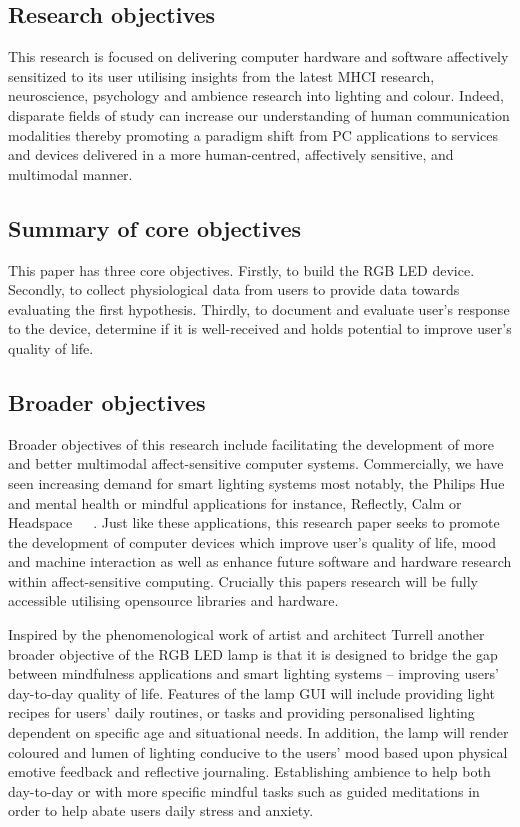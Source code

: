 \documentclass{sigchi}
\begin{document}
\subsection{Research objectives}

This research is focused on delivering computer hardware and software affectively sensitized to its user utilising insights from the latest MHCI research, neuroscience, psychology and ambience research into lighting and colour. Indeed, disparate fields of study can increase our understanding of human communication modalities thereby promoting a paradigm shift from PC applications to services and devices delivered in a more human-centred, affectively sensitive, and multimodal manner. 

\subsection{Summary of core objectives}

This paper has three core objectives. Firstly, to build the RGB LED device. Secondly, to collect physiological data from users to provide data towards evaluating the first hypothesis. Thirdly, to document and evaluate user’s response to the device, determine if it is well-received and holds potential to improve user’s quality of life.

\subsection{Broader objectives}

Broader objectives of this research include facilitating the development of more and better multimodal affect-sensitive computer systems. Commercially, we have seen increasing demand for smart lighting systems most notably, the Philips Hue~\cite{Phillips01} and mental health or mindful applications for instance, Reflectly, Calm or Headspace~\cite{Reflectly01}~\cite{Calm01}~\cite{Headspace01}. Just like these applications, this research paper seeks to promote the development of computer devices which improve user’s quality of life, mood and machine interaction as well as enhance future software and hardware research within affect-sensitive computing. Crucially this papers research will be fully accessible utilising opensource libraries and hardware. 

Inspired by the phenomenological work of artist and architect Turrell another broader objective of the RGB LED lamp is that it is designed to bridge the gap between mindfulness applications and smart lighting systems – improving users’ day-to-day quality of life. Features of the lamp GUI will include providing light recipes for users’ daily routines, or tasks and providing personalised lighting dependent on specific age and situational needs. In addition, the lamp will render coloured and lumen of lighting conducive to the users’ mood based upon physical emotive feedback and reflective journaling. Establishing ambience to help both day-to-day or with more specific mindful tasks such as guided meditations in order to help abate users daily stress and anxiety.
\end{document}
